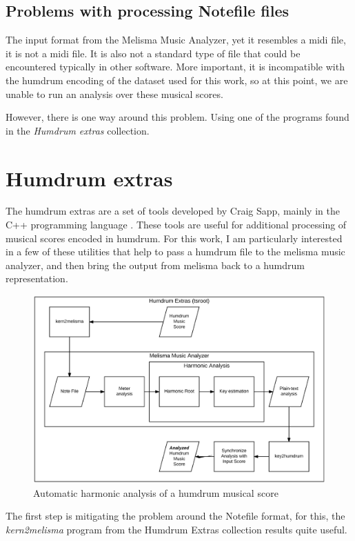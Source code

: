   \subsection{Problems with processing Notefile files}
    The input format from the Melisma Music Analyzer, yet it resembles a midi file, it is not a midi file. It is also not a standard type of file that could be encountered typically in other software. More important, it is incompatible with the humdrum encoding of the dataset used for this work, so at this point, we are unable to run an analysis over these musical scores.

    However, there is one way around this problem. Using one of the programs found in the \emph{Humdrum extras} collection.

\section{Humdrum extras}
  The humdrum extras are a set of tools developed by Craig Sapp, mainly in the C++ programming language \cite{humextra}. These tools are useful for additional processing of musical scores encoded in humdrum. For this work, I am particularly interested in a few of these utilities that help to pass a humdrum file to the melisma music analyzer, and then bring the output from melisma back to a humdrum representation.

  \begin{figure}[ht]
    \centering
      \includegraphics[width=1.0\textwidth]{04-methodology/figures/3}
    \caption{Automatic harmonic analysis of a humdrum musical score}
    \label{fig:software_stack3}
  \end{figure}

  The first step is mitigating the problem around the Notefile format, for this, the \emph{kern2melisma} program from the Humdrum Extras collection results quite useful.

